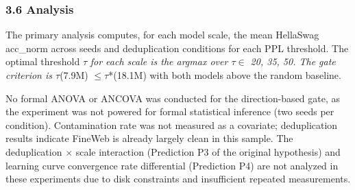 \subsubsection{3.6 Analysis}

The primary analysis computes, for each model scale, the mean HellaSwag acc\_norm across seeds and deduplication conditions for each PPL threshold. The optimal threshold $\tau$\textit{ for each scale is the argmax over $\tau \in$ {20, 35, 50}. The gate criterion is $\tau$}(7.9M) $\leq \tau$*(18.1M) with both models above the random baseline.

No formal ANOVA or ANCOVA was conducted for the direction-based gate, as the experiment was not powered for formal statistical inference (two seeds per condition). Contamination rate was not measured as a covariate; deduplication results indicate FineWeb is already largely clean in this sample. The deduplication $\times$ scale interaction (Prediction P3 of the original hypothesis) and learning curve convergence rate differential (Prediction P4) are not analyzed in these experiments due to disk constraints and insufficient repeated measurements.
